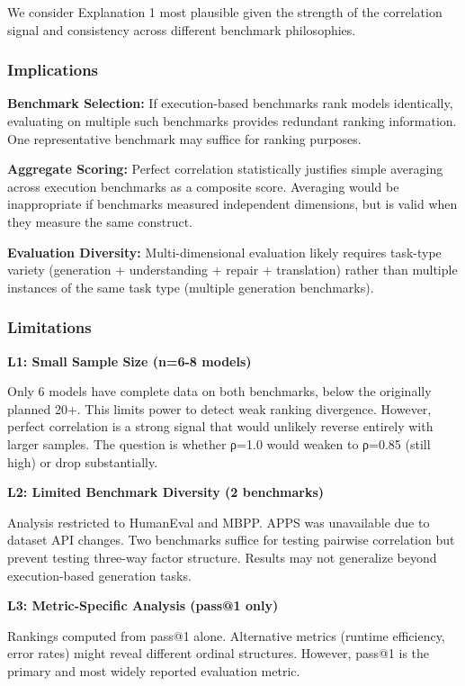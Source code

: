 We consider Explanation 1 most plausible given the strength of the correlation signal and consistency across different benchmark philosophies.

\subsubsection{Implications}

\textbf{Benchmark Selection:} If execution-based benchmarks rank models identically, evaluating on multiple such benchmarks provides redundant ranking information. One representative benchmark may suffice for ranking purposes.

\textbf{Aggregate Scoring:} Perfect correlation statistically justifies simple averaging across execution benchmarks as a composite score. Averaging would be inappropriate if benchmarks measured independent dimensions, but is valid when they measure the same construct.

\textbf{Evaluation Diversity:} Multi-dimensional evaluation likely requires task-type variety (generation + understanding + repair + translation) rather than multiple instances of the same task type (multiple generation benchmarks).

\subsubsection{Limitations}

\textbf{L1: Small Sample Size (n=6-8 models)}

Only 6 models have complete data on both benchmarks, below the originally planned 20+. This limits power to detect weak ranking divergence. However, perfect correlation is a strong signal that would unlikely reverse entirely with larger samples. The question is whether ρ=1.0 would weaken to ρ=0.85 (still high) or drop substantially.

\textbf{L2: Limited Benchmark Diversity (2 benchmarks)}

Analysis restricted to HumanEval and MBPP. APPS was unavailable due to dataset API changes. Two benchmarks suffice for testing pairwise correlation but prevent testing three-way factor structure. Results may not generalize beyond execution-based generation tasks.

\textbf{L3: Metric-Specific Analysis (pass@1 only)}

Rankings computed from pass@1 alone. Alternative metrics (runtime efficiency, error rates) might reveal different ordinal structures. However, pass@1 is the primary and most widely reported evaluation metric.

